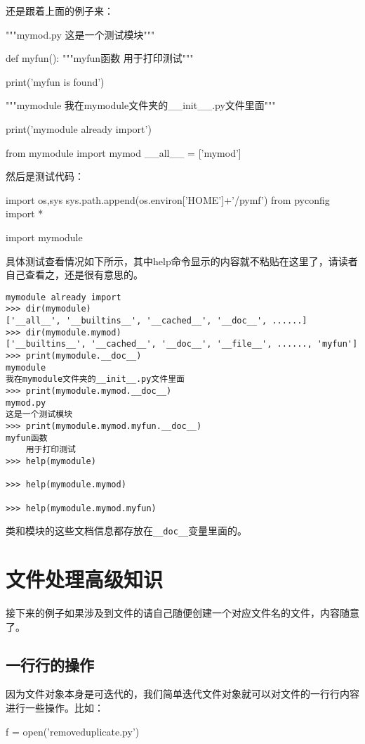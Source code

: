 \documentclass[12pt,oneside]{book}
\begin{document}
\begin{common-format}
还是跟着上面的例子来：
\begin{tcbpython}
"""mymod.py
这是一个测试模块"""

def myfun():
    """myfun函数
    用于打印测试"""

    print('myfun is found')
\end{tcbpython}

\begin{tcbpython}
"""mymodule
我在mymodule文件夹的__init__.py文件里面"""

print('mymodule already import')

from mymodule import mymod
__all__ = ['mymod']
\end{tcbpython}

然后是测试代码：
\begin{tcbpython}
import os,sys
sys.path.append(os.environ['HOME']+'/pymf')
from pyconfig import *

import  mymodule
\end{tcbpython}


具体测试查看情况如下所示，其中help命令显示的内容就不粘贴在这里了，请读者自己查看之，还是很有意思的。
\begin{Verbatim}
mymodule already import
>>> dir(mymodule)
['__all__', '__builtins__', '__cached__', '__doc__', ......]
>>> dir(mymodule.mymod)
['__builtins__', '__cached__', '__doc__', '__file__', ......, 'myfun']
>>> print(mymodule.__doc__)
mymodule
我在mymodule文件夹的__init__.py文件里面
>>> print(mymodule.mymod.__doc__)
mymod.py
这是一个测试模块
>>> print(mymodule.mymod.myfun.__doc__)
myfun函数
    用于打印测试
>>> help(mymodule)

>>> help(mymodule.mymod)

>>> help(mymodule.mymod.myfun)

\end{Verbatim}

类和模块的这些文档信息都存放在\verb+__doc__+变量里面的。




\chapter{文件处理高级知识}
接下来的例子如果涉及到文件的请自己随便创建一个对应文件名的文件，内容随意了。

\section{一行行的操作}
因为文件对象本身是可迭代的，我们简单迭代文件对象就可以对文件的一行行内容进行一些操作。比如：
\begin{tcbpython}
f = open('removeduplicate.py')


\end{tcbpython}
\end{common-format}
\end{document}
